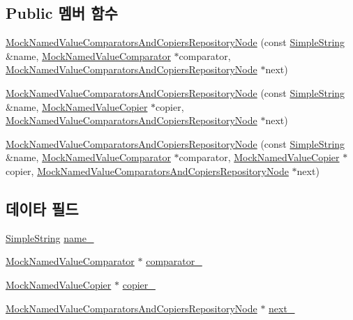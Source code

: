 \subsection*{Public 멤버 함수}
\begin{DoxyCompactItemize}
\item 
\hyperlink{struct_mock_named_value_comparators_and_copiers_repository_node_ad586e4190cd0db9f7938e182486284f4}{Mock\+Named\+Value\+Comparators\+And\+Copiers\+Repository\+Node} (const \hyperlink{class_simple_string}{Simple\+String} \&name, \hyperlink{class_mock_named_value_comparator}{Mock\+Named\+Value\+Comparator} $\ast$comparator, \hyperlink{struct_mock_named_value_comparators_and_copiers_repository_node}{Mock\+Named\+Value\+Comparators\+And\+Copiers\+Repository\+Node} $\ast$next)
\item 
\hyperlink{struct_mock_named_value_comparators_and_copiers_repository_node_a25918c100ef4841769eeb0995a716c1f}{Mock\+Named\+Value\+Comparators\+And\+Copiers\+Repository\+Node} (const \hyperlink{class_simple_string}{Simple\+String} \&name, \hyperlink{class_mock_named_value_copier}{Mock\+Named\+Value\+Copier} $\ast$copier, \hyperlink{struct_mock_named_value_comparators_and_copiers_repository_node}{Mock\+Named\+Value\+Comparators\+And\+Copiers\+Repository\+Node} $\ast$next)
\item 
\hyperlink{struct_mock_named_value_comparators_and_copiers_repository_node_a47f214a188d2ae7cfc49a90d2f37ca72}{Mock\+Named\+Value\+Comparators\+And\+Copiers\+Repository\+Node} (const \hyperlink{class_simple_string}{Simple\+String} \&name, \hyperlink{class_mock_named_value_comparator}{Mock\+Named\+Value\+Comparator} $\ast$comparator, \hyperlink{class_mock_named_value_copier}{Mock\+Named\+Value\+Copier} $\ast$copier, \hyperlink{struct_mock_named_value_comparators_and_copiers_repository_node}{Mock\+Named\+Value\+Comparators\+And\+Copiers\+Repository\+Node} $\ast$next)
\end{DoxyCompactItemize}
\subsection*{데이타 필드}
\begin{DoxyCompactItemize}
\item 
\hyperlink{class_simple_string}{Simple\+String} \hyperlink{struct_mock_named_value_comparators_and_copiers_repository_node_aac73c86e1e892f392d1fc423e25f51a8}{name\+\_\+}
\item 
\hyperlink{class_mock_named_value_comparator}{Mock\+Named\+Value\+Comparator} $\ast$ \hyperlink{struct_mock_named_value_comparators_and_copiers_repository_node_ab6a2a3a4434b05754363c3c0137ffeb1}{comparator\+\_\+}
\item 
\hyperlink{class_mock_named_value_copier}{Mock\+Named\+Value\+Copier} $\ast$ \hyperlink{struct_mock_named_value_comparators_and_copiers_repository_node_a054cf03c0e14abbd5f9f4c9604b5bfbe}{copier\+\_\+}
\item 
\hyperlink{struct_mock_named_value_comparators_and_copiers_repository_node}{Mock\+Named\+Value\+Comparators\+And\+Copiers\+Repository\+Node} $\ast$ \hyperlink{struct_mock_named_value_comparators_and_copiers_repository_node_a2764dc799ce6105dd7b5a74a0aae8f6e}{next\+\_\+}
\end{DoxyCompactItemize}


